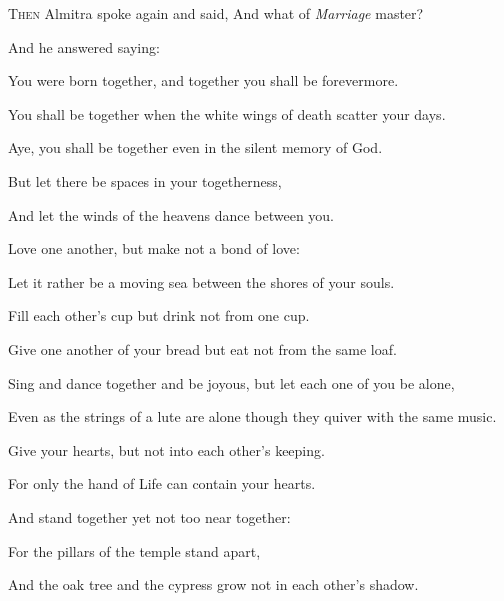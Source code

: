 \lettrine{T}{hen} Almitra spoke again and said,
And what of \textit{Marriage} master?\par

\medskip
And he answered saying:
\medskip

You were born together, and together you
shall be forevermore.

You shall be together when the white
wings of death scatter your days.

Aye, you shall be together even in the
silent memory of God.

But let there be spaces in your
togetherness,

And let the winds of the heavens dance
between you.


Love one another, but make not a bond of
love:

Let it rather be a moving sea between
the shores of your souls.

Fill each other’s cup but drink not from
one cup.

Give one another of your bread but eat
not from the same loaf. 

Sing and dance together and be joyous, but let
each one of you be alone,

Even as the strings of a lute are alone
though they quiver with the same music.


Give your hearts, but not into each
other’s keeping.

For only the hand of Life can contain
your hearts.

And stand together yet not too near
together:

For the pillars of the temple stand
apart,

And the oak tree and the cypress grow
not in each other’s shadow.